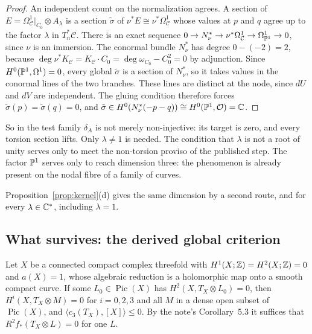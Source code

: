 \begin{proof}
An independent count on the normalization agrees. A section of $E=\Omega^1_{\mathcal C}|_{C_0}\otimes A_\lambda$ is a section $\tilde\sigma$ of $\nu^*E\cong\nu^*\Omega^1_{\mathcal C}$ whose values at $p$ and $q$ agree up to the factor $\lambda$ in $T^*_n\mathcal C$. There is an exact sequence $0\to N^*_\nu\to\nu^*\Omega^1_{\mathcal C}\to\Omega^1_{\mathbb{P}^1}\to0$, since $\nu$ is an immersion. The conormal bundle $N^*_\nu$ has degree $0-(-2)=2$, because $\deg\nu^*K_{\mathcal C}=K_{\mathcal C}\cdot C_0=\deg\omega_{C_0}-C_0^2=0$ by adjunction. Since $H^0(\mathbb{P}^1,\Omega^1)=0$, every global $\tilde\sigma$ is a section of $N^*_\nu$, so it takes values in the conormal lines of the two branches. These lines are distinct at the node, since $dU$ and $dV$ are independent. The gluing condition therefore forces $\tilde\sigma(p)=\tilde\sigma(q)=0$, and $\tilde\sigma\in H^0(N^*_\nu(-p-q))\cong H^0(\mathbb{P}^1,\mathcal O)=\mathbb{C}$.
\end{proof}

\begin{remark}\label{rem:sharp}
So in the test family $\delta_A$ is not merely non-injective: its target is zero, and every torsion section lifts. Only $\lambda\neq1$ is needed. The condition that $\lambda$ is not a root of unity serves only to meet the non-torsion proviso of the published step. The factor $\mathbb{P}^1$ serves only to reach dimension three: the phenomenon is already present on the nodal fibre of a family of curves.
\end{remark}

Proposition~\ref{prop:kernel}(d) gives the same dimension by a second route, and for every $\lambda\in\mathbb{C}^*$, including $\lambda=1$.


\subsection{What survives: the derived global criterion}

\begin{theorem}\label{thm:derived}
Let $X$ be a connected compact complex threefold with $H^1(X;\mathbb{Z})=H^2(X;\mathbb{Z})=0$ and $a(X)=1$, whose algebraic reduction is a holomorphic map onto a smooth compact curve. If some $L_0\in\operatorname{Pic}(X)$ has $H^2(X,T_X\otimes L_0)=0$, then $H^i(X,T_X\otimes M)=0$ for $i=0,2,3$ and all $M$ in a dense open subset of $\operatorname{Pic}(X)$, and $\langle c_3(T_X),[X]\rangle\le0$. By the note's Corollary~5.3 it suffices that $R^2f_*(T_X\otimes L)=0$ for one $L$.
\end{theorem}

